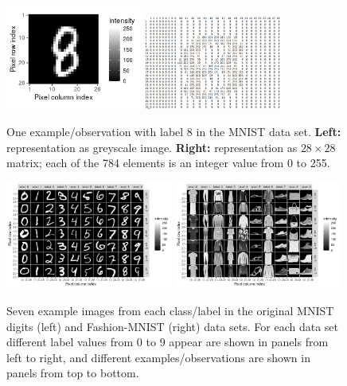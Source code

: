 \documentclass{article}
\begin{document}
  \begin{figure}
    \centering
    \includegraphics[width=0.4\textwidth]{figure-fashion-mnist-one-example}
    \includegraphics[width=0.4\textwidth]{screenshot-8-matrix-values}
    \caption{One example/observation with label 8 in the MNIST data
      set. \textbf{Left:} representation as greyscale
      image. \textbf{Right:} representation as $28 \times 28$ matrix;
      each of the 784 elements is an integer value from 0 to 255.}
    \label{fig:mnist-one-example}
  \end{figure}

  \begin{figure}
    \centering
    \includegraphics[width=0.49\textwidth]{figure-fashion-mnist-digits}
    \includegraphics[width=0.49\textwidth]{figure-fashion-mnist-fashion}
    \caption{Seven example images from each class/label in the original MNIST digits
      (left) and Fashion-MNIST (right) data sets. For each data set
      different label values from 0 to 9 appear are shown in panels
      from left to right, and different examples/observations are
      shown in panels from top to bottom.} 
    \label{fig:fashion-mnist}
  \end{figure}
\end{document}
